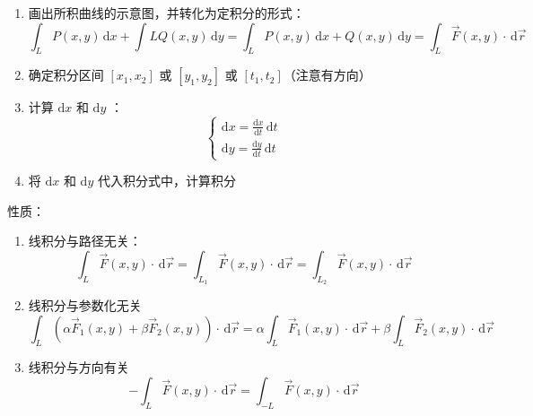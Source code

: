 \begin{enumerate}
    \item 画出所积曲线的示意图，并转化为定积分的形式：
          \[
              \int_{L} P(x,y) \, \mathrm{d}x + \int{L} Q(x,y) \, \mathrm{d}y = \int_{L} P(x,y) \, \mathrm{d}x + Q(x,y) \, \mathrm{d}y = \int_{L} \vec{F}(x,y) \cdot \, \mathrm{d}\vec{r}
          \]
    \item 确定积分区间 $[x_1,x_2]$ 或 $[y_1,y_2]$ 或 $[t_1,t_2]$（注意有方向）
    \item 计算 $\mathrm{d}x$ 和 $\mathrm{d}y$ ：
          \[
              \begin{cases}
                  \mathrm{d}x = \frac{\mathrm{d}x}{\mathrm{d}t} \, \mathrm{d}t \\
                  \mathrm{d}y = \frac{\mathrm{d}y}{\mathrm{d}t} \, \mathrm{d}t
              \end{cases}
          \]
    \item 将 $\mathrm{d}x$ 和 $\mathrm{d}y$ 代入积分式中，计算积分
\end{enumerate}

性质：

\begin{enumerate}
    \item 线积分与路径无关：
          \[
              \int_{L} \vec{F}(x,y) \cdot \, \mathrm{d}\vec{r} = \int_{L_1} \vec{F}(x,y) \cdot \, \mathrm{d}\vec{r} = \int_{L_2} \vec{F}(x,y) \cdot \, \mathrm{d}\vec{r}
          \]
    \item 线积分与参数化无关
          \[
              \int_{L} (\alpha \vec{F}_1 (x,y) + \beta \vec{F}_2 (x,y)) \cdot \, \mathrm{d}\vec{r} = \alpha \int_{L} \vec{F}_1 (x,y) \cdot \, \mathrm{d}\vec{r} + \beta \int_{L} \vec{F}_2 (x,y) \cdot \, \mathrm{d}\vec{r}
          \]
    \item 线积分与方向有关
          \[
              -\int_{L} \vec{F}(x,y) \cdot \, \mathrm{d}\vec{r} = \int_{-L} \vec{F}(x,y) \cdot \, \mathrm{d}\vec{r}
          \]
\end{enumerate}
